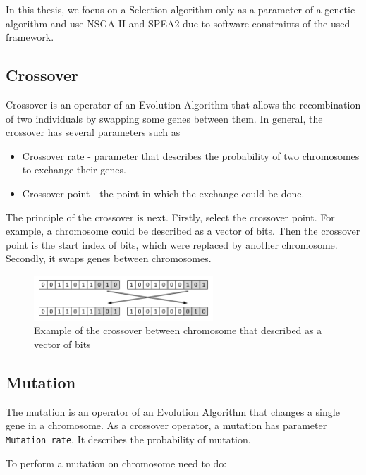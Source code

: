 In this thesis, we focus on a Selection algorithm only as a parameter of a genetic algorithm and use NSGA-II and SPEA2 due to software constraints of the used framework. 

\subsection{Crossover}\label{sec:GeneticAlgorithmCrossover}

Crossover is an operator of an Evolution Algorithm that allows the recombination of two individuals by swapping some genes between them.
In general, the crossover has several parameters such as

\begin{itemize}
	\item Crossover rate - parameter that describes the probability of two chromosomes to exchange their genes.
	\item Crossover point - the point in which the exchange could be done.
\end{itemize}

The principle of the crossover is next.
Firstly, select the crossover point. For example, a chromosome could be described as a vector of bits. Then the crossover point is the start index of bits, which were replaced by another chromosome.
Secondly, it swaps genes between chromosomes.

\begin{figure}
	\centering
	\includegraphics[width=0.6\textwidth]{images/crossoverVector.pdf}
	\caption[Example of the crossover]{Example of the crossover between chromosome that described as a vector of bits}
	\label{fig:crossoverVector}
\end{figure}

\subsection{Mutation}\label{sec:GeneticAlgorithmMutation}

The mutation is an operator of an Evolution Algorithm that changes a single gene in a chromosome. As a crossover operator, a mutation has parameter \texttt{Mutation rate}. It describes the probability of mutation.

To perform a mutation on chromosome need to do:

